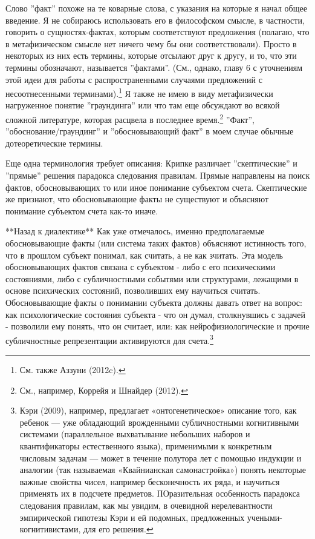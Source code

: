 \documentclass{book}
\begin{document}
Слово ''факт'' похоже на те коварные слова, с указания на которые я начал общее введение. Я не собираюсь использовать его в философском смысле, в частности, говорить о сущностях-фактах, которым соответствуют предложения (полагаю, что в метафизическом смысле нет ничего чему бы они соответствовали). Просто в некоторых из них есть термины, которые отсылают друг к другу, и то, что эти термины обозначают, называется ''фактами''. (См., однако, главу 6 с уточнениям этой идеи для работы с распространенными случаями предложений с несоотнесенными терминами).\footnote{См. также Аззуни (2012c).} Я также не имею в виду метафизически нагруженное понятие ''граундинга'' или что там еще обсуждают во всякой сложной литературе, которая расцвела в последнее время.\footnote{См., например, Коррейя и Шнайдер (2012).} ''Факт'', ''обоснование/граундинг'' и ''обосновывающий факт'' в моем случае обычные дотеоретические термины.

Еще одна терминология требует описания: Крипке различает ''скептические'' и ''прямые'' решения парадокса следования правилам. Прямые направлены на поиск фактов, обосновывающих то или иное понимание субъектом счета. Скептические же признают, что обосновывающие факты не существуют и объясняют понимание субъектом счета как-то иначе.

**Назад к диалектике** Как уже отмечалось, именно предполагаемые обосновывающие факты (или система таких фактов) объясняют истинность того, что в прошлом субъект понимал, как считать, а не как зчитать. Эта модель обосновывающих фактов связана с субъектом - либо с его психическими состояниями, либо с субличностными событями или структурами, лежащими в основе психических состояний, позволивших ему научиться считать. Обосновывающие факты о понимании субъекта должны давать ответ на вопрос: как психологические состояния субъекта - что он думал, столкнувшись с задачей - позволили ему понять, что он считает, или: как нейрофизиологические и прочие субличностные репрезентации активируются для счета.\footnote{Кэри (2009), например, предлагает «онтогенетическое» описание того, как ребенок — уже обладающий врожденными субличностными когнитивными системами (параллельное выхватывание небольших наборов и квантификаторы естественного языка), применимыми к конкретным числовым задачам — может в течение полутора лет с помощью индукции и аналогии (так называемая «Квайнианская самонастройка») понять некоторые важные свойства чисел, например бесконечность их ряда, и научиться применять их в подсчете предметов. ПОразительная особенность парадокса следования правилам, как мы увидим, в очевидной нерелевантности эмпирической гипотезы Кэри и ей подомных, предложенных учеными-когнитивистами, для его решения.}
\end{document}
